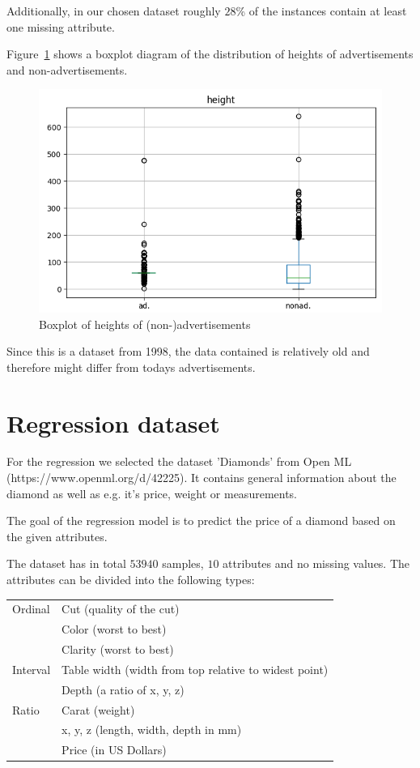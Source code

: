 \documentclass[a4paper,12pt]{article}
\begin{document}
	Additionally, in our chosen dataset roughly $28$\% of the instances contain at least one missing attribute.
	
	Figure~\ref{fig:adsheight} shows a boxplot diagram of the distribution of heights of advertisements and non-advertisements. 
		\begin{figure}[h]
			\centering
			\includegraphics[width=0.7\linewidth]{images/ads_height}
			\caption{Boxplot of heights of (non-)advertisements}
			\label{fig:adsheight}
		\end{figure}
	
	Since this is a dataset from 1998, the data contained is relatively old and therefore might differ from todays advertisements. 

\section{Regression dataset}
	For the regression we selected the dataset 'Diamonds' from Open ML \newline (https://www.openml.org/d/42225). It contains general information about the diamond as well as e.g. it's price, weight or measurements. 
	
	The goal of the regression model is to predict the price of a diamond based on the given attributes. 
	
	The dataset has in total $53940$ samples, $10$ attributes and no missing values. The attributes can be divided into the following types: \\
	
	\begin{tabular}[h]{l|l}
		Ordinal & Cut (quality of the cut) \\
			& Color (worst to best) \\
			& Clarity (worst to best) \\
		\hline
		Interval & Table width (width from top relative to widest point)\\
			& Depth (a ratio of x, y, z) \\
		\hline
		Ratio & Carat (weight) \\
			& x, y, z (length, width, depth in mm) \\
			& Price (in US Dollars) 
	\end{tabular} \\
	
\end{document}
